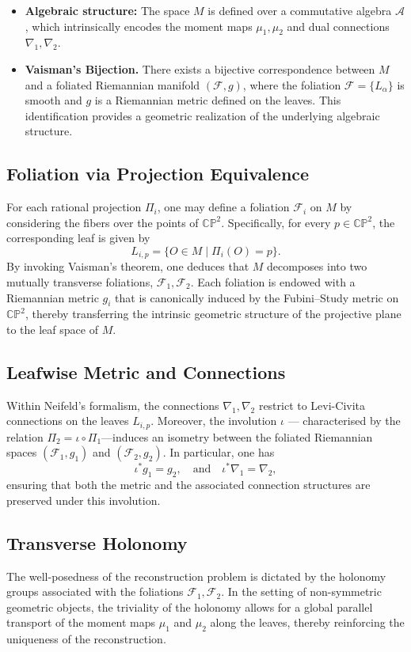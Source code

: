 \documentclass[runningheads]{llncs}
\newcommand{\cF}{\mathcal{F}}
\newcommand{\cA}{\mathcal{A}}
\begin{document}
\begin{itemize}
    \item \textbf{Algebraic structure:} The space \( M \) is defined over a commutative algebra \( \cA \), which intrinsically encodes the moment maps \( \mu_1, \mu_2 \) and dual connections \( \nabla_1, \nabla_2 \). 
    \item \textbf{Vaisman’s Bijection.} There exists a bijective correspondence between \( M \) and a foliated Riemannian manifold \( (\mathcal{F}, g) \), where the foliation \( \mathcal{F} = \{L_\alpha\} \) is smooth and \( g \) is a Riemannian metric defined on the leaves. This identification provides a geometric realization of the underlying algebraic structure.
\end{itemize}

\subsection{Foliation via Projection Equivalence}
For each rational projection \( \Pi_i \), one may define a foliation \( \cF_i \) on \( M \) by considering the fibers over the points of  $\mathbb{CP}^2$. Specifically, for every  \( p \in \mathbb{CP}^2 \), the corresponding leaf is given by 
\[
L_{i,p} = \{ O \in M \mid \Pi_i(O) = p \}.
\]
By invoking Vaisman's theorem,  one deduces that \( M \) decomposes into two mutually transverse foliations, \( \cF_1, \cF_2 \). Each foliation is endowed with a Riemannian metric \( g_i \) that is canonically induced by the Fubini--Study metric on \( \mathbb{CP}^2 \), thereby transferring the intrinsic geometric structure of the projective plane to the leaf space of $M$.

\subsection{Leafwise Metric and Connections}
Within Neifeld’s formalism, the connections \( \nabla_1, \nabla_2 \) restrict to Levi-Civita connections on the leaves \( L_{i,p} \). Moreover, the involution \( \iota \) --- characterised by the relation \( \Pi_2 = \iota \circ \Pi_1 \)---induces an isometry between the foliated Riemannian spaces \( (\cF_1, g_1) \) and \( (\cF_2, g_2) \). In particular, one has 
\[
\iota^* g_1 = g_2, \quad \text{and} \quad \iota^* \nabla_1 = \nabla_2,
\]
ensuring that both the metric and the associated connection structures are preserved under this involution. 

\subsection{Transverse Holonomy}
The well-posedness of the reconstruction problem is dictated by the holonomy groups associated with the foliations \( \cF_1, \cF_2 \). In the setting of non-symmetric geometric objects, the triviality of the holonomy allows for a global parallel transport of the moment maps $\mu_1$ and $\mu_2$ along the leaves, thereby reinforcing the uniqueness of the reconstruction. 
\end{document}
